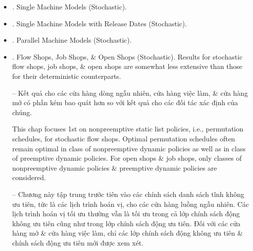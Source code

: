 \documentclass{article}
\newtheorem{definition}{Definition}
\begin{document}
\begin{itemize}
\begin{itemize}
        \begin{definition}[Increasing convex ordering]
            A continuous time random variable $X_1$ is said to be larger than a continuous time random variable $X_2$ in increasing convex sense if
            \begin{equation*}
                \int_0^\infty h(t)dF_1(t)\ge\int_0^\infty h(t)dF_2(t)
            \end{equation*}
            for all increasing convex functions $h$. Discrete time random variable $X_1$ is said to be larger than discrete time random variable $X_2$ in increasing convex sense if
            \begin{equation*}
                \sum_{t=0}^\infty h(t)P(X_1 = t)\ge\sum_{t=0}^\infty h(t)P(X_2 = t)
            \end{equation*}
            for all increasing convex functions $h$. This ordering is denoted by $X_1\ge_{icx}X_2$.
        \end{definition}
    \end{itemize}
    \item {. Single Machine Models (Stochastic).}
    \item {. Single Machine Models with Release Dates (Stochastic).}
    \item {. Parallel Machine Models (Stochastic).}
    \item {. Flow Shops, Job Shops, \& Open Shops (Stochastic).} Results for stochastic flow shops, job shops, \& open shops are somewhat less extensive than those for their deterministic counterparts.

    -- Kết quả cho các cửa hàng dòng ngẫu nhiên, cửa hàng việc làm, \& cửa hàng mở có phần kém bao quát hơn so với kết quả cho các đối tác xác định của chúng.

    This chap focuses 1st on nonpreemptive static list policies, i.e., permutation schedules, for stochastic flow shops. Optimal permutation schedules often remain optimal in class of nonpreemptive dynamic policies as well as in class of preemptive dynamic policies. For open shops \& job shops, only classes of nonpreemptive dynamic policies \& preemptive dynamic policies are considered.

    -- Chương này tập trung trước tiên vào các chính sách danh sách tĩnh không ưu tiên, tức là các lịch trình hoán vị, cho các cửa hàng luồng ngẫu nhiên. Các lịch trình hoán vị tối ưu thường vẫn là tối ưu trong cả lớp chính sách động không ưu tiên cũng như trong lớp chính sách động ưu tiên. Đối với các cửa hàng mở \& cửa hàng việc làm, chỉ các lớp chính sách động không ưu tiên \& chính sách động ưu tiên mới được xem xét.


\end{itemize}
\end{document}
